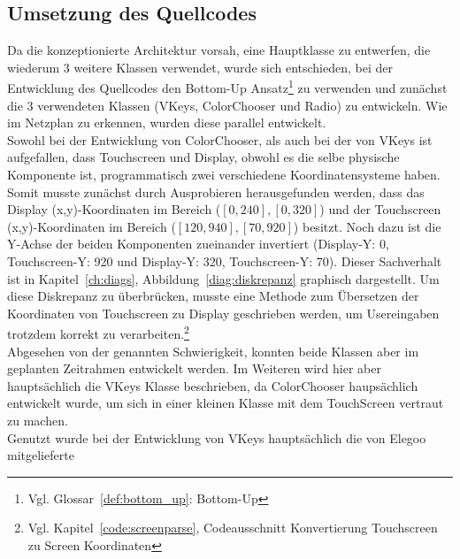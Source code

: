 \documentclass[a4paper, 11pt]{scrartcl}
\begin{document}
\subsection{Umsetzung des Quellcodes}
Da die konzeptionierte Architektur vorsah, eine Hauptklasse zu entwerfen, die wiederum 3 weitere Klassen verwendet, wurde sich entschieden, bei der Entwicklung des
Quellcodes den Bottom-Up Ansatz\footnote{Vgl. Glossar~\ref{def:bottom_up}: Bottom-Up} zu verwenden und zunächst die 3 verwendeten Klassen (\glqq VKeys\grqq{}, \glqq ColorChooser\grqq{} und \glqq Radio\grqq{})
zu entwickeln. Wie im Netzplan zu erkennen, wurden diese parallel entwickelt.
\\
Sowohl bei der Entwicklung von \glqq ColorChooser\grqq{}, als auch bei der von \glqq VKeys\grqq{} ist aufgefallen, dass Touchscreen und Display, obwohl es die selbe physische Komponente ist, programmatisch zwei 
verschiedene Koordinatensysteme haben. Somit musste zunächst durch Ausprobieren herausgefunden werden, dass das Display (x,y)-Koordinaten im Bereich
($\left[\text{0},\text{240}\right],\left[\text{0},\text{320}\right]$) und der Touchscreen (x,y)-Koordinaten im Bereich 
($\left[\text{120},\text{940}\right],\left[\text{70},\text{920}\right]$) besitzt. Noch dazu ist die Y-Achse der beiden Komponenten zueinander invertiert
(Display-Y: 0, Touchscreen-Y: 920 und Display-Y: 320, Touchscreen-Y: 70). Dieser Sachverhalt ist in Kapitel~\ref{ch:diags}, Abbildung~\ref{diag:diskrepanz}
graphisch dargestellt. Um diese Diskrepanz zu überbrücken, musste eine Methode zum Übersetzen der Koordinaten von Touchscreen zu Display geschrieben werden, um 
Usereingaben trotzdem korrekt zu verarbeiten.\footnote{Vgl. Kapitel~\ref{code:screenparse}, Codeausschnitt \glqq Konvertierung Touchscreen zu Screen Koordinaten\grqq{}}
\\
Abgesehen von der genannten Schwierigkeit, konnten beide Klassen aber im geplanten Zeitrahmen entwickelt werden. Im Weiteren wird hier aber hauptsächlich die VKeys
Klasse beschrieben, da \glqq ColorChooser\grqq{} haupsächlich entwickelt wurde, um sich in einer kleinen Klasse mit dem TouchScreen vertraut zu machen. 
\\
Genutzt wurde bei der Entwicklung von \glqq VKeys\grqq{} hauptsächlich die von Elegoo mitgelieferte
\end{document}
